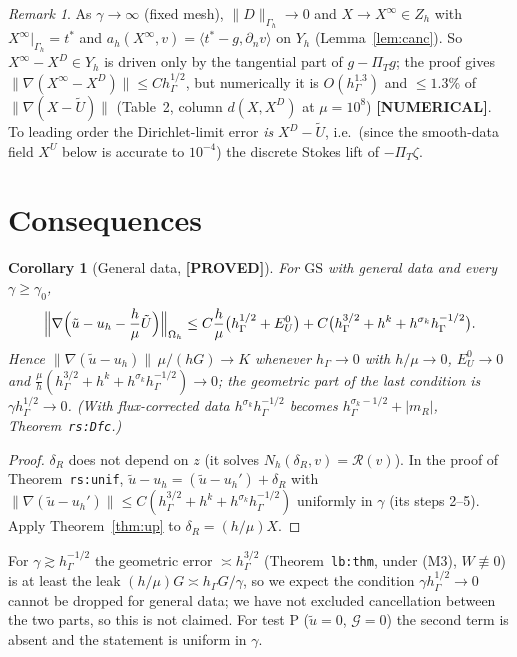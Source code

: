 \documentclass[11pt]{article}
\newtheorem{corollary}[theorem]{Corollary}
\theoremstyle{remark}
\newtheorem{remark}[theorem]{Remark}
\newcommand{\hG}{h_\Gamma}
\newcommand{\Gh}{\Gamma_h}
\newcommand{\Oh}{\Omega_h}
\newcommand{\Zh}{Z_h}
\newcommand{\Yh}{Y_h}
\newcommand{\PT}{\Pi_T}
\newcommand{\norm}[1]{\|#1\|}
\newcommand{\ip}[2]{\langle #1,#2\rangle}
\newcommand{\dn}{\partial_n}
\newcommand{\Ut}{\tilde U}
\newcommand{\EU}{E^{0}_{U}}
\newcommand{\GS}{\mathrm{GS}}
\newcommand{\Rc}{\mathcal R}
\newcommand{\Gc}{\mathcal G}
\newcommand{\ut}{\tilde u}
\newcommand{\lab}[1]{\textbf{[#1]}}
\begin{document}
\begin{remark}\label{rem:limit}
As $\gamma\to\infty$ (fixed mesh), $\norm D_{\Gh}\to0$ and $X\to X^\infty\in\Zh$ with $X^\infty|_{\Gh}=t^\ast$ and $a_h(X^\infty,v)=\ip{t^\ast-g}{\dn v}$ on $\Yh$ (Lemma~\ref{lem:canc}). So $X^\infty-X^D\in\Yh$ is driven only by the tangential part of $g-\PT g$; the proof gives $\norm{\nabla(X^\infty-X^D)}\le C\hG^{1/2}$, but numerically it is $O(\hG^{1.3})$ and $\le1.3\%$ of $\norm{\nabla(X-\Ut)}$ (Table~2, column $d(X,X^D)$ at $\mu=10^8$) \lab{NUMERICAL}. To leading order the Dirichlet-limit error \emph{is} $X^D-\Ut$, i.e.\ (since the smooth-data field $X^U$ below is accurate to $10^{-4}$) the discrete Stokes lift of $-\PT\zeta$.
\end{remark}

\section{Consequences}
\begin{corollary}[General data, \lab{PROVED}]\label{cor:gen}
For $\GS$ with general data and every $\gamma\ge\gamma_0$,
\[
\Bigl\|\nabla\Bigl(\ut-u_h-\frac h\mu\Ut\Bigr)\Bigr\|_{\Oh}\le C\frac h\mu\bigl(\hG^{1/2}+\EU\bigr)+C\bigl(\hG^{3/2}+h^k+h^{\sigma_k}\hG^{-1/2}\bigr).
\]
Hence $\norm{\nabla(\ut-u_h)}\,\mu/(hG)\to K$ whenever $\hG\to0$ with $h/\mu\to0$, $\EU\to0$ and $\frac\mu h(\hG^{3/2}+h^k+h^{\sigma_k}\hG^{-1/2})\to0$; the geometric part of the last condition is $\gamma\hG^{1/2}\to0$. (With flux-corrected data $h^{\sigma_k}\hG^{-1/2}$ becomes $\hG^{\sigma_k-1/2}+|m_R|$, Theorem~\texttt{rs:Dfc}.)
\end{corollary}
\begin{proof}
$\delta_R$ does not depend on $z$ (it solves $N_h(\delta_R,v)=\Rc(v)$). In the proof of Theorem~\texttt{rs:unif}, $\ut-u_h=(\ut-u_h')+\delta_R$ with $\norm{\nabla(\ut-u_h')}\le C(\hG^{3/2}+h^k+h^{\sigma_k}\hG^{-1/2})$ uniformly in $\gamma$ (its steps 2--5). Apply Theorem~\ref{thm:up} to $\delta_R=(h/\mu)X$.
\end{proof}
For $\gamma\gtrsim\hG^{-1/2}$ the geometric error $\asymp\hG^{3/2}$ (Theorem~\texttt{lb:thm}, under (M3), $W\not\equiv0$) is at least the leak $(h/\mu)G\asymp\hG G/\gamma$, so we expect the condition $\gamma\hG^{1/2}\to0$ cannot be dropped for general data; we have not excluded cancellation between the two parts, so this is not claimed. For test P ($\ut=0$, $\Gc=0$) the second term is absent and the statement is uniform in $\gamma$.
\end{document}
